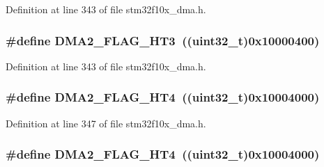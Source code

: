 Definition at line 343 of file stm32f10x\+\_\+dma.\+h.

\subsubsection[{\texorpdfstring{D\+M\+A2\+\_\+\+F\+L\+A\+G\+\_\+\+H\+T3}{DMA2_FLAG_HT3}}]{\setlength{\rightskip}{0pt plus 5cm}\#define D\+M\+A2\+\_\+\+F\+L\+A\+G\+\_\+\+H\+T3~(({\bf uint32\+\_\+t})0x10000400)}\hypertarget{group___d_m_a__flags__definition_ga1af48c549d9aa04e8161cb8b398ef39c}{}\label{group___d_m_a__flags__definition_ga1af48c549d9aa04e8161cb8b398ef39c}


Definition at line 343 of file stm32f10x\+\_\+dma.\+h.

\subsubsection[{\texorpdfstring{D\+M\+A2\+\_\+\+F\+L\+A\+G\+\_\+\+H\+T4}{DMA2_FLAG_HT4}}]{\setlength{\rightskip}{0pt plus 5cm}\#define D\+M\+A2\+\_\+\+F\+L\+A\+G\+\_\+\+H\+T4~(({\bf uint32\+\_\+t})0x10004000)}\hypertarget{group___d_m_a__flags__definition_ga3dde40e2dbcdb12e4c1a2a2b5a8b3a60}{}\label{group___d_m_a__flags__definition_ga3dde40e2dbcdb12e4c1a2a2b5a8b3a60}


Definition at line 347 of file stm32f10x\+\_\+dma.\+h.

\subsubsection[{\texorpdfstring{D\+M\+A2\+\_\+\+F\+L\+A\+G\+\_\+\+H\+T4}{DMA2_FLAG_HT4}}]{\setlength{\rightskip}{0pt plus 5cm}\#define D\+M\+A2\+\_\+\+F\+L\+A\+G\+\_\+\+H\+T4~(({\bf uint32\+\_\+t})0x10004000)}\hypertarget{group___d_m_a__flags__definition_ga3dde40e2dbcdb12e4c1a2a2b5a8b3a60}{}\label{group___d_m_a__flags__definition_ga3dde40e2dbcdb12e4c1a2a2b5a8b3a60}


